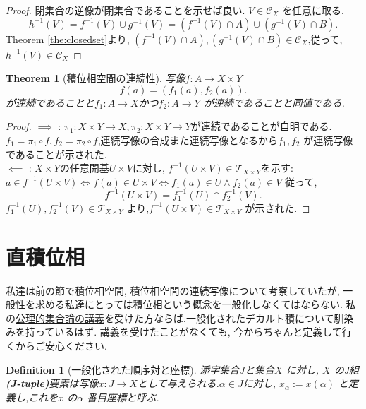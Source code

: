 \documentclass[dvipdfmx]{jbook}
\newtheorem{theorem}{Theorem}[section]
\newtheorem{definition}{Definition}[section]
\theoremstyle{remark}
\theoremstyle{plain}
\begin{document}
\begin{proof}
	閉集合の逆像が閉集合であることを示せば良い.
	$V\in \mathcal{C}_X$ を任意に取る.
	\[
	h^{-1}(V) =f^{-1}(V) \cup g^{-1}(V) = \left( f^{-1}(V) \cap A \right) \cup \left( g^{-1}(V) \cap B \right) 
	.\] 
	Theorem \ref{the:closedset}より, $\left( f^{-1}(V) \cap A \right),\left( g^{-1}(V) \cap B \right) \in \mathcal{C}_X $,従って,$h^{-1}(V) \in \mathcal{C}_X$
\end{proof}

\begin{theorem}[積位相空間の連続性]
	写像$f:A \to X\times Y$\[
	f(a)=\left( f_1(a),f_2(a) \right) 
	.\] 	
	が連続であることと$f_1 : A\to X$かつ$f_2 : A \to Y$ が連続であることと同値である.
\end{theorem}

\begin{proof}
	$\implies$ : $\pi_1 : X\times Y \to X,\pi_2 : X\times Y \to Y$が連続であることが自明である. $f_1=\pi_1 \circ f, f_2=\pi_2 \circ f $,連続写像の合成また連続写像となるから$f_1,f_2$ が連続写像であることが示された.\\
	$\impliedby$ : $X\times Y$の任意開基$U\times V$に対し, $f^{-1}\left( U\times V \right) \in \mathcal{T}_{X\times Y}$を示す: $a \in f^{-1}(U\times V) \iff f(a) \in U\times V \iff f_1(a) \in U \land f_2(a) \in V$
	従って,
	\[
	f^{-1}(U\times V) = f_1^{-1}(U) \cap f_2^{-1}(V)
	.\] 
	$f_1^{-1}(U),f_2^{-1}(V) \in \mathcal{T}_{X\times Y}$ より,$f^{-1}(U\times V) \in \mathcal{T}_{X\times Y}$ が示された.
\end{proof}

\section{直積位相}%
\label{sec:直積位相}
私達は前の節で積位相空間, 積位相空間の連続写像について考察していたが, 一般性を求める私達にとっては積位相という概念を一般化しなくてはならない. 私の\textcolor{red}{\href{https://top-xiao.github.io/blog}{公理的集合論の講義}}を受けた方ならば,一般化されたデカルト積について馴染みを持っているはず. 講義を受けたことがなくても, 今からちゃんと定義して行くからご安心ください.

\begin{definition}[一般化された順序対と座標]
	添字集合$J$と集合$X$ に対し, $X$ のJ組 \textbf{(J-tuple)}要素は写像$x:J\to X$として与えられる.$\alpha \in J$に対し, $x_{\alpha}:=x\left( \alpha \right) $ と定義し,これを$x$ の$\alpha$ 番目座標と呼ぶ.
\end{definition}
\end{document}
